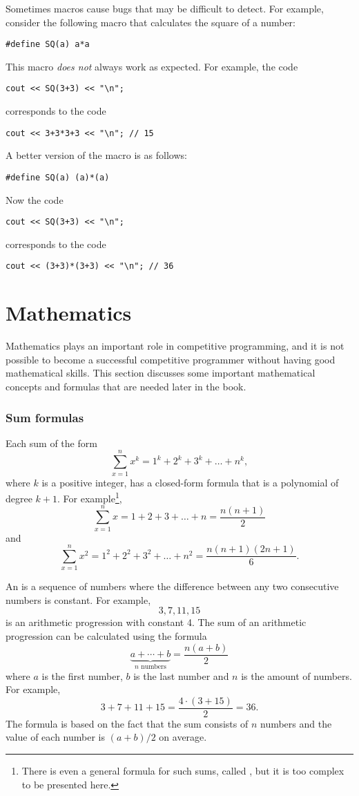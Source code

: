 Sometimes macros cause bugs that may be difficult
to detect. For example, consider the following macro
that calculates the square of a number:
\begin{lstlisting}
#define SQ(a) a*a
\end{lstlisting}
This macro \emph{does not} always work as expected.
For example, the code
\begin{lstlisting}
cout << SQ(3+3) << "\n";
\end{lstlisting}
corresponds to the code
\begin{lstlisting}
cout << 3+3*3+3 << "\n"; // 15
\end{lstlisting}

A better version of the macro is as follows:
\begin{lstlisting}
#define SQ(a) (a)*(a)
\end{lstlisting}
Now the code
\begin{lstlisting}
cout << SQ(3+3) << "\n";
\end{lstlisting}
corresponds to the code
\begin{lstlisting}
cout << (3+3)*(3+3) << "\n"; // 36
\end{lstlisting}


\section{Mathematics}

Mathematics plays an important role in competitive
programming, and it is not possible to become
a successful competitive programmer without
having good mathematical skills.
This section discusses some important
mathematical concepts and formulas that
are needed later in the book.

\subsubsection{Sum formulas}

Each sum of the form
\[\sum_{x=1}^n x^k = 1^k+2^k+3^k+\ldots+n^k,\]
where $k$ is a positive integer,
has a closed-form formula that is a
polynomial of degree $k+1$.
For example\footnote{
There is even a general formula for such sums, called ,
but it is too complex to be presented here.},
\[\sum_{x=1}^n x = 1+2+3+\ldots+n = \frac{n(n+1)}{2}\]
and
\[\sum_{x=1}^n x^2 = 1^2+2^2+3^2+\ldots+n^2 = \frac{n(n+1)(2n+1)}{6}.\]

An  is a 
sequence of numbers
where the difference between any two consecutive
numbers is constant.
For example,
\[3, 7, 11, 15\]
is an arithmetic progression with constant 4.
The sum of an arithmetic progression can be calculated
using the formula
\[\underbrace{a + \cdots + b}_{n \,\, \textrm{numbers}} = \frac{n(a+b)}{2}\]
where $a$ is the first number,
$b$ is the last number and
$n$ is the amount of numbers.
For example,
\[3+7+11+15=\frac{4 \cdot (3+15)}{2} = 36.\]
The formula is based on the fact
that the sum consists of $n$ numbers and
the value of each number is $(a+b)/2$ on average.

